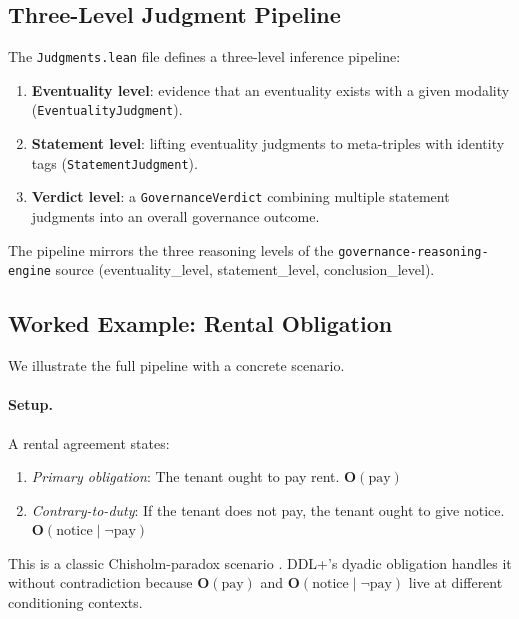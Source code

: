 \documentclass[]{article}
\newcommand{\code}[1]{\texttt{#1}}
\newcommand{\OB}{\ensuremath{\mathbf{O}}}
\newcommand{\DDL}{\textup{DDL+}}
\begin{document}
\subsection{Three-Level Judgment Pipeline}

The \code{Judgments.lean} file defines a three-level inference pipeline:

\begin{enumerate}
\item \textbf{Eventuality level}: evidence that an eventuality exists with
      a given modality (\code{EventualityJudgment}).
\item \textbf{Statement level}: lifting eventuality judgments to meta-triples
      with identity tags (\code{StatementJudgment}).
\item \textbf{Verdict level}: a \code{GovernanceVerdict} combining multiple
      statement judgments into an overall governance outcome.
\end{enumerate}

\noindent
The pipeline mirrors the three reasoning levels of the
\code{governance-reasoning-engine} source \cite{GovReasoningEngine}
(eventuality\_level, statement\_level, conclusion\_level).

\subsection{Worked Example: Rental Obligation}
\label{sec:rental}

We illustrate the full pipeline with a concrete scenario.

\paragraph{Setup.}
A rental agreement states:
\begin{enumerate}
\item[(P)] \emph{Primary obligation}: The tenant ought to pay rent.
  \hfill $\OB(\text{pay})$
\item[(CTD)] \emph{Contrary-to-duty}: If the tenant does not pay,
  the tenant ought to give notice.
  \hfill $\OB(\text{notice} \mid \neg\text{pay})$
\end{enumerate}

\noindent
This is a classic Chisholm-paradox scenario \cite{Chisholm1963}.
\DDL{}'s dyadic obligation handles it without contradiction because
$\OB(\text{pay})$ and $\OB(\text{notice} \mid \neg\text{pay})$ live at
different conditioning contexts.
\end{document}
